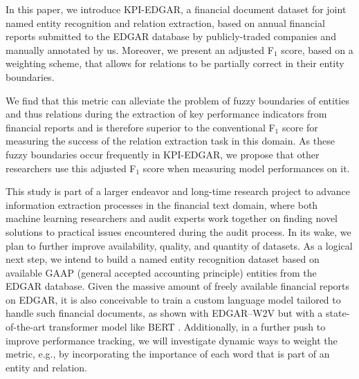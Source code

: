 \documentclass[conference, table]{IEEEtran}
\newcommand{\1} {\mathbbm{1}}
\begin{document}
In this paper, we introduce KPI-EDGAR, a financial document dataset for joint named entity recognition and relation extraction, based on annual financial reports submitted to the EDGAR database by publicly-traded companies and manually annotated by us. Moreover, we present an adjusted F$_1$ score, based on a weighting scheme, that allows for relations to be partially correct in their entity boundaries.

We find that this metric can alleviate the problem of fuzzy boundaries of entities and thus relations during the extraction of key performance indicators from financial reports and is therefore superior to the conventional F$_1$ score for measuring the success of the relation extraction task in this domain. As these fuzzy boundaries occur frequently in KPI-EDGAR, we propose that other researchers use this adjusted F$_1$ score when measuring model performances on it.

This study is part of a larger endeavor and long-time research project to advance information extraction processes in the financial text domain, where both machine learning researchers and audit experts work together on finding novel solutions to practical issues encountered during the audit process. In its wake, we plan to further improve availability, quality, and quantity of datasets. 
As a logical next step, we intend to build a named entity recognition dataset based on available GAAP (general accepted accounting principle) entities from the EDGAR database. Given the massive amount of freely available financial reports on EDGAR, it is also conceivable to train a custom language model tailored to handle such financial documents, as shown with EDGAR--W2V \cite{loukas2021edgar} but with a state-of-the-art transformer model like BERT \cite{devlin2018bert}. Additionally, in a further push to improve performance tracking, we will investigate dynamic ways to weight the metric, e.g., by incorporating the importance of each word that is part of an entity and relation.


\balance
 

\end{document}

